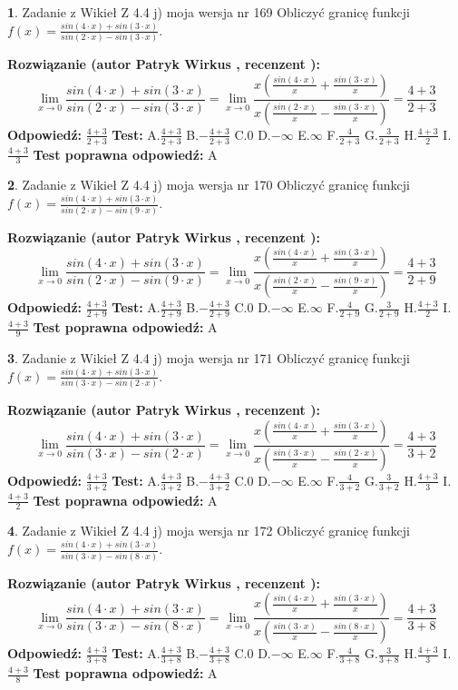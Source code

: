 \documentclass[12pt, a4paper]{article}
\theoremstyle{definition} %
\newtheorem{zad}{}
\newcommand{\zadStart}[1]{\begin{zad}#1\newline}
\newcommand{\zadStop}{\end{zad}}
\newcommand{\rozwStart}[2]{\noindent \textbf{Rozwiązanie (autor #1 , recenzent #2): }\newline}
\newcommand{\rozwStop}{\newline}
\newcommand{\odpStart}{\noindent \textbf{Odpowiedź:}\newline}
\newcommand{\odpStop}{\newline}
\newcommand{\testStart}{\noindent \textbf{Test:}\newline}
\newcommand{\testStop}{\newline}
\newcommand{\kluczStart}{\noindent \textbf{Test poprawna odpowiedź:}\newline}
\newcommand{\kluczStop}{\newline}
\begin{document}
\zadStart{Zadanie z Wikieł Z 4.4 j) moja wersja nr 169}
Obliczyć granicę funkcji $f(x)=\frac{sin(4\cdot x) +sin(3\cdot x)}{sin(2\cdot x) -sin(3\cdot x)}$.
\zadStop
\rozwStart{Patryk Wirkus}{}
$$\lim\limits_{x\to 0}\frac{sin(4\cdot x) +sin(3\cdot x)}{sin(2\cdot x) -sin(3\cdot x)}=\lim\limits_{x\to 0}\frac{x(\frac{sin(4\cdot x)}{x}+\frac{sin(3\cdot x)}{x})}{x(\frac{sin(2\cdot x)}{x}-\frac{sin(3\cdot x)}{x})}=\frac{4+3}{2+3}$$
\rozwStop
\odpStart
$\frac{4+3}{2+3}$
\odpStop
\testStart
A.$\frac{4+3}{2+3}$
B.$-\frac{4+3}{2+3}$
C.$0$
D.$-\infty$
E.$\infty$
F.$\frac{4}{2+3}$
G.$\frac{3}{2+3}$
H.$\frac{4+3}{2}$
I.$\frac{4+3}{3}$
\testStop
\kluczStart
A
\kluczStop



\zadStart{Zadanie z Wikieł Z 4.4 j) moja wersja nr 170}
Obliczyć granicę funkcji $f(x)=\frac{sin(4\cdot x) +sin(3\cdot x)}{sin(2\cdot x) -sin(9\cdot x)}$.
\zadStop
\rozwStart{Patryk Wirkus}{}
$$\lim\limits_{x\to 0}\frac{sin(4\cdot x) +sin(3\cdot x)}{sin(2\cdot x) -sin(9\cdot x)}=\lim\limits_{x\to 0}\frac{x(\frac{sin(4\cdot x)}{x}+\frac{sin(3\cdot x)}{x})}{x(\frac{sin(2\cdot x)}{x}-\frac{sin(9\cdot x)}{x})}=\frac{4+3}{2+9}$$
\rozwStop
\odpStart
$\frac{4+3}{2+9}$
\odpStop
\testStart
A.$\frac{4+3}{2+9}$
B.$-\frac{4+3}{2+9}$
C.$0$
D.$-\infty$
E.$\infty$
F.$\frac{4}{2+9}$
G.$\frac{3}{2+9}$
H.$\frac{4+3}{2}$
I.$\frac{4+3}{9}$
\testStop
\kluczStart
A
\kluczStop



\zadStart{Zadanie z Wikieł Z 4.4 j) moja wersja nr 171}
Obliczyć granicę funkcji $f(x)=\frac{sin(4\cdot x) +sin(3\cdot x)}{sin(3\cdot x) -sin(2\cdot x)}$.
\zadStop
\rozwStart{Patryk Wirkus}{}
$$\lim\limits_{x\to 0}\frac{sin(4\cdot x) +sin(3\cdot x)}{sin(3\cdot x) -sin(2\cdot x)}=\lim\limits_{x\to 0}\frac{x(\frac{sin(4\cdot x)}{x}+\frac{sin(3\cdot x)}{x})}{x(\frac{sin(3\cdot x)}{x}-\frac{sin(2\cdot x)}{x})}=\frac{4+3}{3+2}$$
\rozwStop
\odpStart
$\frac{4+3}{3+2}$
\odpStop
\testStart
A.$\frac{4+3}{3+2}$
B.$-\frac{4+3}{3+2}$
C.$0$
D.$-\infty$
E.$\infty$
F.$\frac{4}{3+2}$
G.$\frac{3}{3+2}$
H.$\frac{4+3}{3}$
I.$\frac{4+3}{2}$
\testStop
\kluczStart
A
\kluczStop



\zadStart{Zadanie z Wikieł Z 4.4 j) moja wersja nr 172}
Obliczyć granicę funkcji $f(x)=\frac{sin(4\cdot x) +sin(3\cdot x)}{sin(3\cdot x) -sin(8\cdot x)}$.
\zadStop
\rozwStart{Patryk Wirkus}{}
$$\lim\limits_{x\to 0}\frac{sin(4\cdot x) +sin(3\cdot x)}{sin(3\cdot x) -sin(8\cdot x)}=\lim\limits_{x\to 0}\frac{x(\frac{sin(4\cdot x)}{x}+\frac{sin(3\cdot x)}{x})}{x(\frac{sin(3\cdot x)}{x}-\frac{sin(8\cdot x)}{x})}=\frac{4+3}{3+8}$$
\rozwStop
\odpStart
$\frac{4+3}{3+8}$
\odpStop
\testStart
A.$\frac{4+3}{3+8}$
B.$-\frac{4+3}{3+8}$
C.$0$
D.$-\infty$
E.$\infty$
F.$\frac{4}{3+8}$
G.$\frac{3}{3+8}$
H.$\frac{4+3}{3}$
I.$\frac{4+3}{8}$
\testStop
\kluczStart
A
\kluczStop
\end{document}
